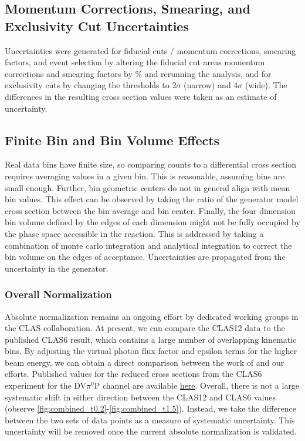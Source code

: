     \subsection*{Momentum Corrections, Smearing, and Exclusivity Cut Uncertainties}
    Uncertainties were generated for fiducial cuts / momentum corrections, smearing factors, and event selection by altering the fiducial cut areas momentum corrections and smearing factors by \% and rerunning the analysis, and for exclusivity cuts by changing the thresholds to 2$\sigma$ (narrow) and 4$\sigma$ (wide). The differences in the resulting cross section values were taken as an estimate of uncertainty. 

    \subsection*{Finite Bin and Bin Volume Effects}
    Real data bins have finite size, so comparing counts to a differential cross section requires averaging values in a given bin. This is reasonable, assuming bins are small enough. Further, bin geometric centers do not in general align with mean bin values. This effect can be observed by taking the ratio of the generator model cross section between the bin average and bin center. Finally, the four dimension bin volume defined by the edges of each dimension might not be fully occupied by the phase space accessible in the reaction. This is addressed by taking a combination of monte carlo integration and analytical integration to correct the bin volume on the edges of acceptance. Uncertainties are propagated from the uncertainty in the generator.     
        
    \subsubsection*{Overall Normalization}

    Absolute normalization remains an ongoing effort by dedicated working groups in the CLAS collaboration. At present, we can compare the CLAS12 data to the published CLAS6 result, which contains a large number of overlapping kinematic bins. By adjusting the virtual photon flux factor and epsilon terms for the higher beam energy, we can obtain a direct comparison between the work of \parencite{Bedlinskiy2014ExclusiveCLAS} and our efforts. Published values for the reduced cross sections from the CLAS6 experiment for the DV$\pi^0$P channel are available \href{https://journals.aps.org/prc/supplemental/10.1103/PhysRevC.90.025205}{here}. Overall, there is not a large systematic shift in either direction between the CLAS12 and CLAS6 values (observe \ref{fig:combined_t0.2}-\ref{fig:combined_t1.5}). Instead, we take the difference between the two sets of data points as a measure of systematic uncertainty. This uncertainty will be removed once the current absolute normalization is validated. 


